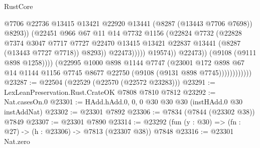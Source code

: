 \begin{lexlean}{RustCore}
\begin{coremodule}
                                            @7706
                                            @22736
                                            @13415
                                            @13421
                                            @22920
                                            @13441
                                            (@8287 (@13443 @7706 @7698))
                                            @8293))
                                        (@22451
                                          @966
                                          @67
                                          @11
                                          @14
                                          @7732
                                          @1156
                                          (@22824
                                            @7732
                                            (@22828
                                              @7374
                                              @3047
                                              @7717
                                              @7727
                                              @22470
                                              @13415
                                              @13421
                                              @22837
                                              @13441
                                              (@8287 (@13443 @7727 @7718))
                                              @8293))
                                          @22473)))))
                                @19574))
                            @22473))
                        (@9108 (@9111 @898 @1258))))
                    (@22995
                      @1000
                      @898
                      @1144
                      @7747
                      (@23001
                        @172
                        @898
                        @67
                        @14
                        @1144
                        @1156
                        @7745
                        @8677
                        @22750
                        (@9108 (@9131 @898 @7745))))))))))))
@23287 := @22504 (@22529 (@22570 (@22572 @23283)))
@23291 := LexLeanPreservation.Rust.CrateOK @7808 @7810 @7812
@23292 := Nat.casesOn.{0}
@23301 := HAdd.hAdd.{0, 0, 0} @30 @30 @30 (instHAdd.{0} @30 instAddNat)
@23302 := @23301 @7892
@23306 := @7834 (@7844 (@23302 @38)) @7849
@23307 := @23301 @7890
@23314 := @23292 (fun (y : @30) => (fn : @27) -> (h : @23306) -> @7813 (@23307 @38)) @7848
@23316 := @23301 Nat.zero

\end{coremodule}
\end{lexlean}
